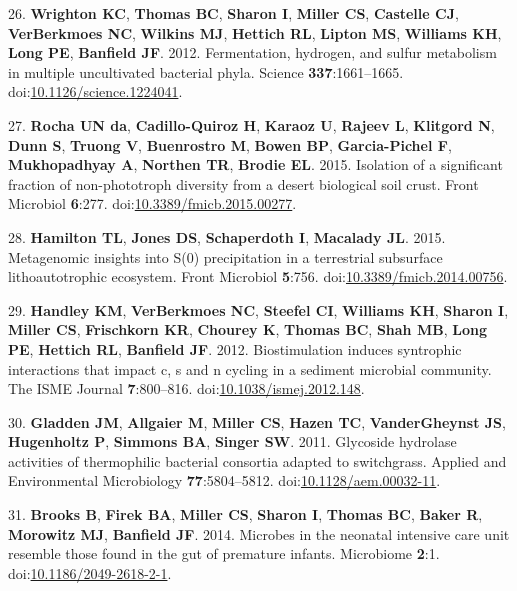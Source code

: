 \documentclass[11pt,]{article}
\begin{document}
\hypertarget{ref-Wrighton2012}{}
26. \textbf{Wrighton KC}, \textbf{Thomas BC}, \textbf{Sharon I},
\textbf{Miller CS}, \textbf{Castelle CJ}, \textbf{VerBerkmoes NC},
\textbf{Wilkins MJ}, \textbf{Hettich RL}, \textbf{Lipton MS},
\textbf{Williams KH}, \textbf{Long PE}, \textbf{Banfield JF}. 2012.
Fermentation, hydrogen, and sulfur metabolism in multiple uncultivated
bacterial phyla. Science \textbf{337}:1661--1665.
doi:\href{https://doi.org/10.1126/science.1224041}{10.1126/science.1224041}.

\hypertarget{ref-NunesdaRocha2015}{}
27. \textbf{Rocha UN da}, \textbf{Cadillo-Quiroz H}, \textbf{Karaoz U},
\textbf{Rajeev L}, \textbf{Klitgord N}, \textbf{Dunn S}, \textbf{Truong
V}, \textbf{Buenrostro M}, \textbf{Bowen BP}, \textbf{Garcia-Pichel F},
\textbf{Mukhopadhyay A}, \textbf{Northen TR}, \textbf{Brodie EL}. 2015.
Isolation of a significant fraction of non-phototroph diversity from a
desert biological soil crust. Front Microbiol \textbf{6}:277.
doi:\href{https://doi.org/10.3389/fmicb.2015.00277}{10.3389/fmicb.2015.00277}.

\hypertarget{ref-Hamilton2015}{}
28. \textbf{Hamilton TL}, \textbf{Jones DS}, \textbf{Schaperdoth I},
\textbf{Macalady JL}. 2015. Metagenomic insights into S(0) precipitation
in a terrestrial subsurface lithoautotrophic ecosystem. Front Microbiol
\textbf{5}:756.
doi:\href{https://doi.org/10.3389/fmicb.2014.00756}{10.3389/fmicb.2014.00756}.

\hypertarget{ref-Handley2012}{}
29. \textbf{Handley KM}, \textbf{VerBerkmoes NC}, \textbf{Steefel CI},
\textbf{Williams KH}, \textbf{Sharon I}, \textbf{Miller CS},
\textbf{Frischkorn KR}, \textbf{Chourey K}, \textbf{Thomas BC},
\textbf{Shah MB}, \textbf{Long PE}, \textbf{Hettich RL},
\textbf{Banfield JF}. 2012. Biostimulation induces syntrophic
interactions that impact c, s and n cycling in a sediment microbial
community. The ISME Journal \textbf{7}:800--816.
doi:\href{https://doi.org/10.1038/ismej.2012.148}{10.1038/ismej.2012.148}.

\hypertarget{ref-Gladden2011}{}
30. \textbf{Gladden JM}, \textbf{Allgaier M}, \textbf{Miller CS},
\textbf{Hazen TC}, \textbf{VanderGheynst JS}, \textbf{Hugenholtz P},
\textbf{Simmons BA}, \textbf{Singer SW}. 2011. Glycoside hydrolase
activities of thermophilic bacterial consortia adapted to switchgrass.
Applied and Environmental Microbiology \textbf{77}:5804--5812.
doi:\href{https://doi.org/10.1128/aem.00032-11}{10.1128/aem.00032-11}.

\hypertarget{ref-Brooks2014}{}
31. \textbf{Brooks B}, \textbf{Firek BA}, \textbf{Miller CS},
\textbf{Sharon I}, \textbf{Thomas BC}, \textbf{Baker R},
\textbf{Morowitz MJ}, \textbf{Banfield JF}. 2014. Microbes in the
neonatal intensive care unit resemble those found in the gut of
premature infants. Microbiome \textbf{2}:1.
doi:\href{https://doi.org/10.1186/2049-2618-2-1}{10.1186/2049-2618-2-1}.
\end{document}
